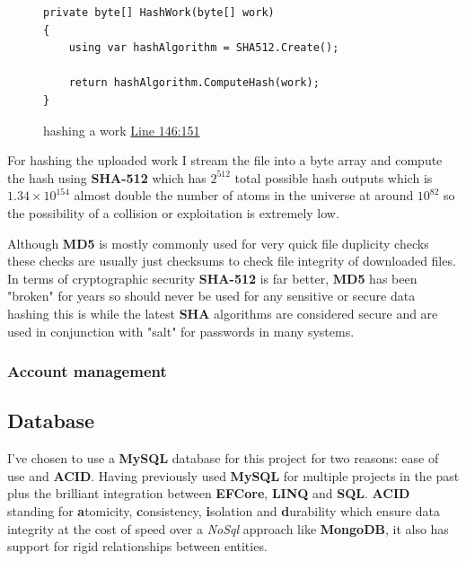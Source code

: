 \documentclass[12pt]{article}
\begin{document}
\begin{figure}[H]
\caption{hashing a work \href{https://github.com/MrHarrisonBarker/CRPL/blob/main/CRPL.Web/Services/WorksVerificationService.cs}{Line 146:151}}
\centering
\begin{lstlisting}[language=CSharp]
private byte[] HashWork(byte[] work)
{
	using var hashAlgorithm = SHA512.Create();

	return hashAlgorithm.ComputeHash(work);
}
\end{lstlisting}
\end{figure}

For hashing the uploaded work I stream the file into a byte array and compute the hash using \textbf{SHA-512} which has \(2^{512}\) total possible hash outputs which is \(1.34 \times 10^{154}\) almost double the number of atoms in the universe at around \(10^{82}\) so the possibility of a collision or exploitation is extremely low. 

Although \textbf{MD5} is mostly commonly used for very quick file duplicity checks these checks are usually just checksums to check file integrity of downloaded files. In terms of cryptographic security \textbf{SHA-512} is far better, \textbf{MD5} has been "broken" for years so should never be used for any sensitive or secure data hashing this is while the latest \textbf{SHA} algorithms are considered secure and are used in conjunction with "salt" for passwords in many systems.

\subsubsection{Account management}


\subsection{Database}

I've chosen to use a \textbf{MySQL} database for this project for two reasons: ease of use and \textbf{ACID}. Having previously used \textbf{MySQL} for multiple projects in the past plus the brilliant integration between \textbf{EFCore}, \textbf{LINQ} and \textbf{SQL}. \textbf{ACID} standing for \textbf{a}tomicity, \textbf{c}onsistency, \textbf{i}solation and \textbf{d}urability which ensure data integrity at the cost of speed over a \textit{NoSql} approach like \textbf{MongoDB}, it also has support for rigid relationships between entities.
\end{document}
